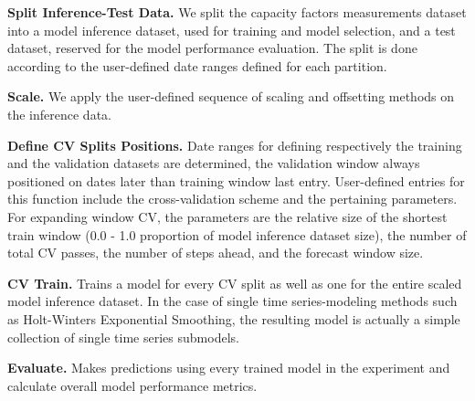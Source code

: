 \vspace{1em}
\noindent
\textbf{Split Inference-Test Data.}  We split the capacity factors measurements dataset into a model inference dataset, used for training and model selection, and a test dataset, reserved for the model performance evaluation.
The split is done according to the user-defined date ranges defined for each partition.

\vspace{1em}
\noindent
\textbf{Scale.}  We apply the user-defined sequence of scaling and offsetting methods on the inference data.

\vspace{1em}
\noindent
\textbf{Define CV Splits Positions.}  Date ranges for defining respectively the training and the validation datasets are determined, the validation window always positioned on dates later than training window last entry.
User-defined entries for this function include the cross-validation scheme and the pertaining parameters.
For expanding window CV, the parameters are the relative size of the shortest train window (0.0 - 1.0 proportion of model inference dataset size), the number of total CV passes, the number of steps ahead, and the forecast window size.

\vspace{1em}
\noindent
\textbf{CV Train.}  Trains a model for every CV split as well as one for the entire scaled model inference dataset.
In the case of single time series-modeling methods such as Holt-Winters Exponential Smoothing, the resulting model is actually a simple collection of single time series submodels.

\vspace{1em}
\noindent
\textbf{Evaluate.}  Makes predictions using every trained model in the experiment and calculate overall model performance metrics.